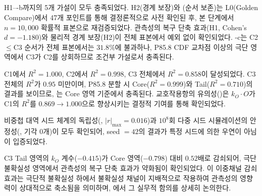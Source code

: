 \subsection{}
\label{subsec:hypothesis_interpretation}

H1---b까지의 5개 가설이 모두 충족되었다.
H2(경계 보장)와 (순서 보존)는 L0(Golden Compare)에서 47개 포인트를 통해
결정론적으로 사전 확인된 후, 본 단계에서 $n = 10{,}000$ 확률적 표본으로 재검증되었다.
관측성의 복구 단축 효과(H1, Cohen's $d = -1.180$)와
물리적 경계 보장(H2)이 전체 표본에서 예외 없이 확인되었다.
-c는 C2$\leq$C3 순서가 전체 표본에서는 $31.8\%$에 불과하나,
P85.8 CDF 교차점 이상의 극단 영역에서 C3가 C2를 상회하므로
조건부 가설로서 충족된다.

C1에서 $R^2 = 1.000$, C2에서 $R^2 = 0.998$, C3 전체에서 $R^2 = 0.858$이 달성되었다.
C3 전체의 $R^2$가 $0.95$ 미만이며, P85.8 분할 시
Core($R^2 = 0.999$)와 Tail($R^2 = 0.710$)의 결과를 보이므로,
는 Core 영역 기준에서 충족된다.
교호작용항의 유의성()은 $k_O \cdot O$가 C1의 $R^2$를
$0.869 \to 1.000$으로 향상시키는 결정적 기여를 통해 확인되었다.

비중첩 대역 시드 체계의 독립성(, $|r|_{\max} = 0.016$)과
$10^8$회 다중 시드 시뮬레이션의 안정성(, 기각 0개)이 모두 확인되어,
seed $= 42$의 결과가 특정 시드에 의한 우연이 아님이 입증되었다.

C3 Tail 영역의 $k_O$ 계수($-0.415$)가 Core 영역($-0.798$) 대비
$0.52$배로 감쇠되어, 극단 불확실성 영역에서 관측성의 복구 단축 효과가
약화됨이 확인되었다. 이 이중채널 감쇠 효과는 극단적 불확실성 하에서
불확실성 채널이 지배적으로 작용하여 관측성의 영향력이
상대적으로 축소됨을 의미하며, 에서 그 실무적 함의를
상세히 논의한다.


